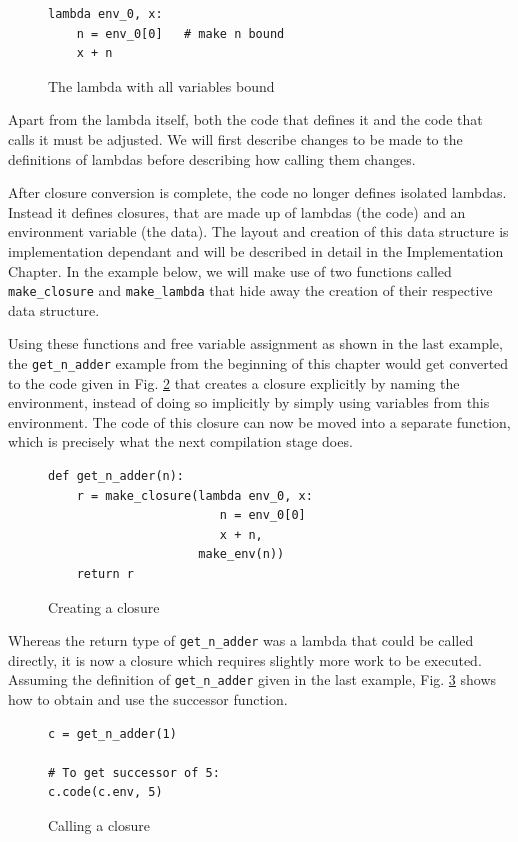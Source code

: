 \documentclass[11pt]{report}
\begin{document}
\begin{figure}[ht]
\begin{lstlisting}
lambda env_0, x: 
    n = env_0[0]   # make n bound
    x + n
\end{lstlisting}
\caption{The lambda with all variables bound}
\label{cc5}
\end{figure}

Apart from the lambda itself, both the code that defines it and the code that calls it must be adjusted. We will first describe changes to be made to the definitions of lambdas before describing how calling them changes.

After closure conversion is complete, the code no longer defines isolated lambdas. Instead it defines closures, that are made up of lambdas (the code) and an environment variable (the data). The layout and creation of this data structure is implementation dependant and will be described in detail in the Implementation Chapter. In the example below, we will make use of two functions called \texttt{make_closure} and \texttt{make_lambda} that hide away the creation of their respective data structure.

Using these functions and free variable assignment as shown in the last example, the \texttt{get_n_adder} example from the beginning of this chapter would get converted to the code given in Fig. \ref{cc6} that creates a closure explicitly by naming the environment, instead of doing so implicitly by simply using variables from this environment. The code of this closure can now be moved into a separate function, which is precisely what the next compilation stage does.

\begin{figure}[ht]
\begin{lstlisting}
def get_n_adder(n):
    r = make_closure(lambda env_0, x: 
                        n = env_0[0]
                        x + n, 
                     make_env(n))
    return r
\end{lstlisting}
\caption{Creating a closure}
\label{cc6}
\end{figure}

Whereas the return type of \texttt{get_n_adder} was a lambda that could be called directly, it is now a closure which requires slightly more work to be executed. Assuming the definition of \texttt{get_n_adder} given in the last example, Fig. \ref{cc7} shows how to obtain and use the successor function.

\begin{figure}[ht]
\begin{lstlisting}
c = get_n_adder(1)

# To get successor of 5:
c.code(c.env, 5)
\end{lstlisting}
\caption{Calling a closure}
\label{cc7}
\end{figure}
\end{document}
